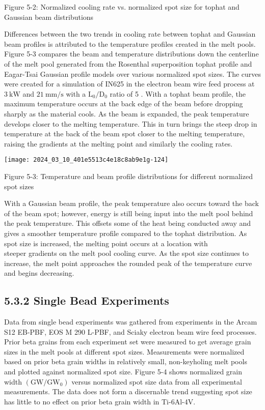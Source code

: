 \documentclass[10pt]{article}
\begin{document}
Figure 5-2: Normalized cooling rate vs. normalized spot size for tophat and Gaussian beam distributions

Differences between the two trends in cooling rate between tophat and Gaussian beam profiles is attributed to the temperature profiles created in the melt pools. Figure 5-3 compares the beam and temperature distributions down the centerline of the melt pool generated from the Rosenthal superposition tophat profile and Eagar-Tsai Gaussian profile models over various normalized spot sizes. The curves were created for a simulation of IN625 in the electron beam wire feed process at $3 \mathrm{~kW}$ and $21 \mathrm{~mm} / \mathrm{s}$ with a $\mathrm{L}_{0} / \mathrm{D}_{0}$ ratio of 5 . With a tophat beam profile, the maximum temperature occurs at the back edge of the beam before dropping sharply as the material cools. As the beam is expanded, the peak temperature develops closer to the melting temperature. This in turn brings the steep drop in temperature at the back of the beam spot closer to the melting temperature, raising the gradients at the melting point and similarly the cooling rates.

\begin{center}
\texttt{[image: 2024\_03\_10\_401e5513c4e18c8ab9e1g-124]}
\end{center}

Figure 5-3: Temperature and beam profile distributions for different normalized spot sizes

With a Gaussian beam profile, the peak temperature also occurs toward the back of the beam spot; however, energy is still being input into the melt pool behind the peak temperature. This offsets some of the heat being conducted away and gives a smoother temperature profile compared to the tophat distribution. As spot size is increased, the melting point occurs at a location with\\
steeper gradients on the melt pool cooling curve. As the spot size continues to increase, the melt point approaches the rounded peak of the temperature curve and begins decreasing.

\subsection*{5.3.2 Single Bead Experiments}
Data from single bead experiments was gathered from experiments in the Arcam S12 EB-PBF, EOS M 290 L-PBF, and Sciaky electron beam wire feed processes. Prior beta grains from each experiment set were measured to get average grain sizes in the melt pools at different spot sizes. Measurements were normalized based on prior beta grain widths in relatively small, non-keyholing melt pools and plotted against normalized spot size. Figure 5-4 shows normalized grain width $\left(\mathrm{GW} / \mathrm{GW}_{0}\right)$ versus normalized spot size data from all experimental measurements. The data does not form a discernable trend suggesting spot size has little to no effect on prior beta grain width in Ti-6Al-4V.
\end{document}
